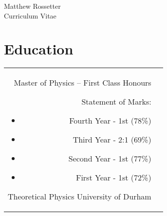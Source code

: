 \documentclass[10pt]{article} %
\begin{document}
\begin{paracol}{2} %


\parbox[top][0.12\textheight][c]{\linewidth}{ %
	\vspace{-0.04\textheight} %
	\centering %
	{\sffamily\Huge Matthew Rossetter}\\\medskip %
	{\Huge\color{headings}\cvtextfont Curriculum Vitae}
}

\section{Education}





\begin{supertabular}{rp{6.7cm}} %


	{Master of Physics -- First Class Honours} %
    {Statement of Marks:
        \begin{itemize}[noitemsep]
            \item Fourth Year - 1st (78\%)
        \item Third Year - 2:1 (69\%)
        \item Second Year - 1st (77\%)
        \item First Year - 1st (72\%)
    \end{itemize}\vspace{-10pt}} %
	{Theoretical Physics} %
	{University of Durham} %


\end{supertabular}
\end{paracol}
\end{document}
